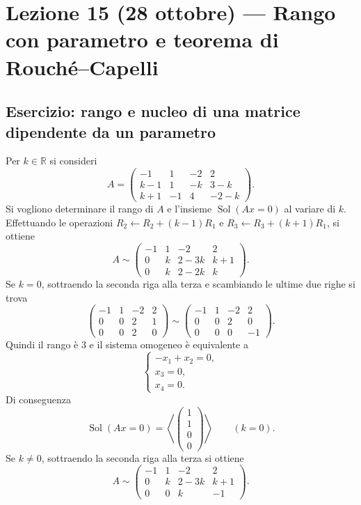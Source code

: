 \documentclass[11pt,a4paper]{article}
\newcommand{\RR}{\mathbb{R}}
\theoremstyle{plain}
\theoremstyle{definition}
\theoremstyle{remark}
\begin{document}
\section{Lezione 15 (28 ottobre) --- Rango con parametro e teorema di Rouché--Capelli}

\subsection{Esercizio: rango e nucleo di una matrice dipendente da un parametro}
Per $k\in\RR$ si consideri
\[
 A=\begin{pmatrix}
 -1&1&-2&2\\
 k-1&1&-k&3-k\\
 k+1&-1&4&-2-k
 \end{pmatrix}.
\]
Si vogliono determinare il rango di $A$ e l'insieme $\operatorname{Sol}(Ax=0)$ al variare di $k$. Effettuando le operazioni $R_2\leftarrow R_2+(k-1)R_1$ e $R_3\leftarrow R_3+(k+1)R_1$, si ottiene
\[
 A\sim\begin{pmatrix}
 -1&1&-2&2\\
 0&k&2-3k&k+1\\
 0&k&2-2k&k
 \end{pmatrix}.
\]
Se $k=0$, sottraendo la seconda riga alla terza e scambiando le ultime due righe si trova
\[
 \begin{pmatrix}-1&1&-2&2\\0&0&2&1\\0&0&2&0\end{pmatrix}
 \sim\begin{pmatrix}-1&1&-2&2\\0&0&2&0\\0&0&0&-1\end{pmatrix}.
\]
Quindi il rango è $3$ e il sistema omogeneo è equivalente a
\[
 \begin{cases}-x_1+x_2=0,\\x_3=0,\\x_4=0.\end{cases}
\]
Di conseguenza
\[
 \operatorname{Sol}(Ax=0)=\left\langle\begin{pmatrix}1\\1\\0\\0\end{pmatrix}\right\rangle\qquad(k=0).
\]
Se $k\ne0$, sottraendo la seconda riga alla terza si ottiene
\[
 A\sim\begin{pmatrix}-1&1&-2&2\\0&k&2-3k&k+1\\0&0&k&-1\end{pmatrix}.
\]
\end{document}
